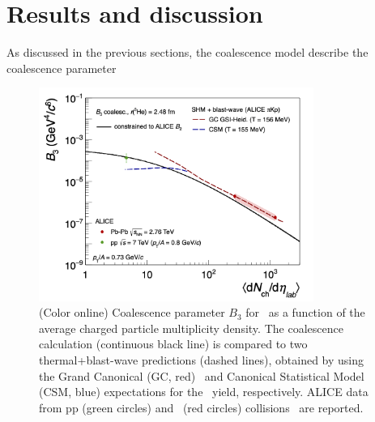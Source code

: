 \documentclass{appolb}
\begin{document}
\section{Results and discussion} \label{sec:results}
As discussed in the previous sections, the coalescence model describe the coalescence parameter

\begin{figure}[htb]
\begin{center}
\includegraphics[width=0.8\textwidth]{B3vsMult073.png}
\caption{(Color online) Coalescence parameter $B_3$ for \hethree~as a function of the average charged particle multiplicity density. The coalescence calculation (continuous black line) is compared to two thermal+blast-wave predictions (dashed lines), obtained by using the Grand Canonical (GC, red)~\cite{Andronic:2017} and Canonical Statistical Model (CSM, blue) \cite{Vovchenko:2018fiy} expectations for the \hethree~yield, respectively. ALICE data from pp (green circles) and \PbPb~(red circles) collisions~\cite{ALICE:nucleipp2017,ALICE:deuteronppPbPb2015} are reported. }
\label{Fig:3He}
\end{center}
\end{figure} 
\end{document}
